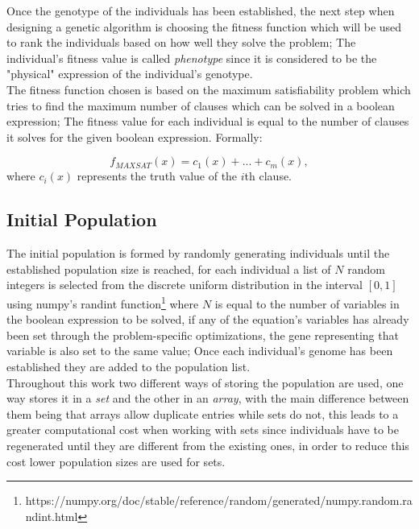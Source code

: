 Once the genotype of the individuals has been established, the next step when designing a genetic algorithm is choosing the fitness function which will be used to rank the individuals based on how well they solve the problem; The individual's fitness value is called \textit{phenotype} since it is considered to be the "physical" expression of the individual's genotype.
\\The fitness function chosen is based on the maximum satisfiability problem which tries to find the maximum number of clauses which can be solved in a boolean expression; The fitness value for each individual is equal to the number of clauses it solves for the given boolean expression. Formally:

\begin{equation*}
f_{MAXSAT}(x)= c_1(x)+...+c_m(x),
\end{equation*}
where $c_i(x)$ represents the truth value of the $i$th clause.

\subsection{Initial Population}

The initial population is formed by randomly generating individuals until the established population size is reached, for each individual a list of $N$ random integers is selected from the discrete uniform distribution in the interval $[0,1]$ using numpy's randint function\footnote{https://numpy.org/doc/stable/reference/random/generated/numpy.random.randint.html} where $N$ is equal to the number of variables in the boolean expression to be solved, if any of the equation's variables has already been set through the problem-specific optimizations, the gene representing that variable is also set to the same value; Once each individual's genome has been established they are added to the population list.
\\Throughout this work two different ways of storing the population are used, one way stores it in a \textit{set} and the other in an \textit{array}, with the main difference between them being that arrays allow duplicate entries while sets do not, this leads to a greater computational cost when working with sets since individuals have to be regenerated until they are different from the existing ones, in order to reduce this cost lower population sizes are used for sets.  

